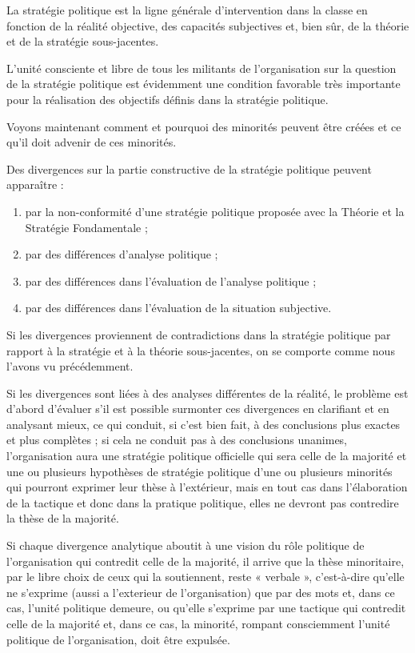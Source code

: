 La stratégie politique est la ligne générale d'intervention dans la classe en fonction de la réalité objective, des capacités subjectives et, bien sûr, de la théorie et de la stratégie sous-jacentes.

L'unité consciente et libre de tous les militants de l'organisation sur la question de la stratégie politique est évidemment une condition favorable très importante pour la réalisation des objectifs définis dans la stratégie politique.

Voyons maintenant comment et pourquoi des minorités peuvent être créées et ce qu'il doit advenir de ces minorités.

Des divergences sur la partie constructive de la stratégie politique peuvent apparaître :

\begin{enumerate}
\item{} par la non-conformité d'une stratégie politique proposée avec la Théorie et la Stratégie Fondamentale ;
\item{} par des différences d'analyse politique ;
\item{} par des différences dans l'évaluation de l'analyse politique ;
\item{} par des différences dans l'évaluation de la situation subjective.
\end{enumerate}

Si les divergences proviennent de contradictions dans la stratégie politique par rapport à la stratégie et à la théorie sous-jacentes, on se comporte comme nous l'avons vu précédemment.

Si les divergences sont liées à des analyses différentes de la réalité, le problème est d'abord d'évaluer s'il est possible surmonter ces divergences en clarifiant et en analysant mieux, ce qui conduit, si c'est bien fait, à des conclusions plus exactes et plus complètes ; si cela ne conduit pas à des conclusions unanimes, l'organisation aura une stratégie politique officielle qui sera celle de la majorité et une ou plusieurs hypothèses de stratégie politique d'une ou plusieurs minorités qui pourront exprimer leur thèse à l'extérieur, mais en tout cas dans l'élaboration de la tactique et donc dans la pratique politique, elles ne devront pas contredire la thèse de la majorité.

Si chaque divergence analytique aboutit à une vision du rôle politique de l'organisation qui contredit celle de la majorité, il arrive que la thèse minoritaire, par le libre choix de ceux qui la soutiennent, reste « verbale », c'est-à-dire qu'elle ne s'exprime (aussi a l’exterieur de l’organisation) que par des mots et, dans ce cas, l'unité politique demeure, ou qu'elle s'exprime par une tactique qui contredit celle de la majorité et, dans ce cas, la minorité, rompant consciemment l'unité politique de l'organisation, doit être expulsée.

